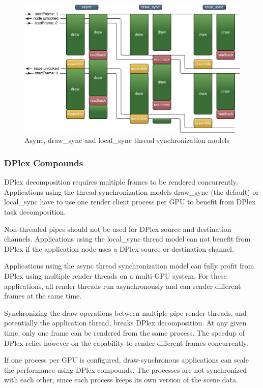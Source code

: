 \documentclass[10pt,a4]{scrartcl}
\begin{document}
\begin{figure}[h!t]\center
  \includegraphics[width=.9\textwidth]{images/threadModels.pdf}
  {\caption{\label{fThreadModels}Async, draw\_sync and local\_sync
    thread synchronization models}}
\end{figure}


\subsubsection{\label{sAdvDPlex}DPlex Compounds}

DPlex decomposition requires multiple frames to be rendered
concurrently. Applications using the thread synchronization models
\textsf{draw\_sync} (the default) or \textsf{local\_sync} have to use
one render client process per GPU to benefit from DPlex task
decomposition.

Non-threaded pipes should not be used for DPlex source and destination
channels. Applications using the \textsf{local\_sync} thread model can
not benefit from DPlex if the application node uses a DPlex source or
destination channel.

Applications using the \textsf{async} thread synchronization model can
fully profit from DPlex using multiple render threads on a multi-GPU
system. For these applications, all render threads run asynchronously
and can render different frames at the same time.

Synchronizing the draw operations between multiple pipe render threads,
and potentially the application thread, breaks DPlex decomposition. At
any given time, only one frame can be rendered from the same
process. The speedup of DPlex relies however on the capability to
render different frames concurrently.

If one process per GPU is configured, draw-synchronous applications can
scale the performance using DPlex compounds. The processes are not
synchronized with each other, since each process keeps its own version
of the scene data.
\end{document}
